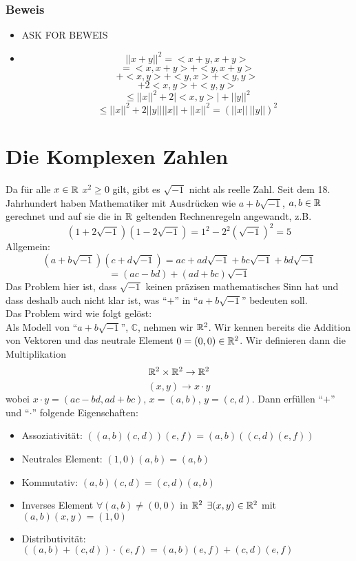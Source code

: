 \subsubsection*{Beweis}
\begin{itemize}
    \item ASK FOR BEWEIS 
    \item \[{\left|\left| x+y\right|\right|}^2=<x+y,x+y>\]
\[=<x,x+y>+<y,x+y>\]
\[<x,x>+<x,y>+<y,x>+<y,y>\]
\[<x,x>+2<x,y>+<y,y>\]
\[\leq {\left|\left| x \right|\right|}^2 + 2|<x,y>| + {\left|\left| y \right|\right|}^2\]
\[\leq {\left|\left| x \right|\right|}^2 + 2{\left|\left| y \right|\right|}  {\left|\left| x \right|\right|} + {\left|\left| x \right|\right|}^2 = (||x|| \: ||y||)^2\]
\end{itemize}

\section{Die Komplexen Zahlen}
Da für alle $x\in\mathbb{R}$ $x^2\geq 0$ gilt, gibt es $\sqrt{-1}$ nicht als reelle Zahl. Seit dem 18. Jahrhundert haben Mathematiker mit Ausdrücken wie $a+b\sqrt{-1}$, $a,b\in\mathbb{R}$ gerechnet und auf sie die in $\mathbb{R}$ geltenden Rechnenregeln angewandt, z.B. \[\left( 1+2\sqrt{-1}\right)\left( 1-2\sqrt{-1}\right) = 1^2 - 2^2\left( \sqrt{-1}\right)^2 = 5\]
Allgemein:
\[\left( a+b\sqrt{-1} \right)\left( c+d\sqrt{-1}\right) = ac + ad\sqrt{-1} + bc\sqrt{-1}+bd\sqrt{-1}\]
\[=\left( ac-bd\right)+\left(ad+bc\right)\sqrt{-1}\]
Das Problem hier ist, dass $\sqrt{-1}$ keinen präzisen mathematisches Sinn hat und dass deshalb auch nicht klar ist, was ``$+$'' in ``$a+b\sqrt{-1}$'' bedeuten soll. \\

\noindent Das Problem wird wie folgt gelöst:\\

Als Modell von ``$a+b\sqrt{-1}$'', $\mathbb{C}$, nehmen wir $\mathbb{R}^2$. Wir kennen bereits die Addition von Vektoren und das neutrale Element $0 = (0,0) \in \mathbb{R}^2$. Wir definieren dann die Multiplikation \[\mathbb{R}^2 \times\mathbb{R}^2 \to \mathbb{R}^2\] \[(x,y)\to x\cdot y \]
wobei $x\cdot y=(ac-bd,ad+bc)$, $x=(a,b)$, $y=(c,d)$. Dann erfüllen ``$+$'' und ``$\cdot$'' folgende Eigenschaften:
\begin{itemize}
\item Assoziativität: $\left((a,b)(c,d)\right)(e,f)=(a,b)\left((c,d)(e,f) \right)$
\item Neutrales Element: $(1,0)(a,b)=(a,b)$
\item Kommutativ: $(a,b)(c,d)=(c,d)(a,b)$
\item Inverses Element $\forall (a,b)\not = (0,0)$ in $\mathbb{R}^2$ $\exists(x,y)\in\mathbb{R}^2$ mit $(a,b)(x,y)=(1,0)$
\item Distributivität: $\left( (a,b)+(c,d)\right)\cdot (e,f)=(a,b)(e,f)+(c,d)(e,f)$
\end{itemize}

